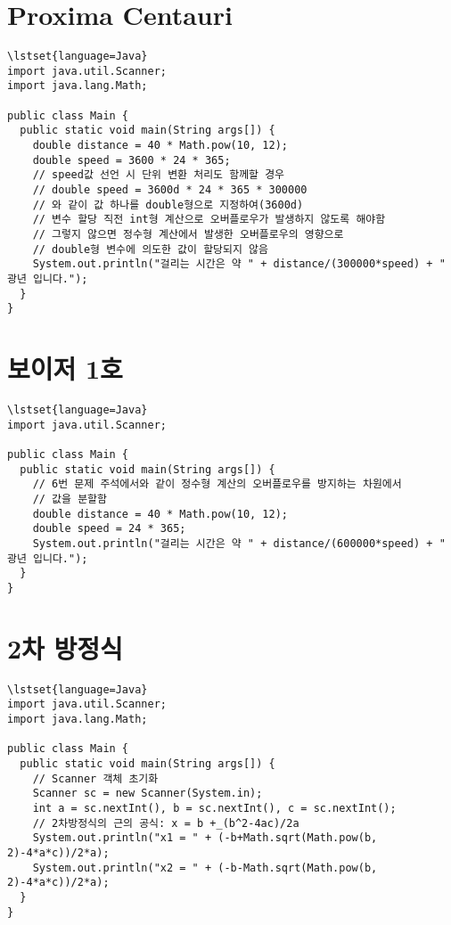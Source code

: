 \documentclass{article}
\begin{document}
\section{Proxima Centauri}
\begin{lstlisting}
\lstset{language=Java}
import java.util.Scanner;
import java.lang.Math;

public class Main {
  public static void main(String args[]) {
    double distance = 40 * Math.pow(10, 12);
    double speed = 3600 * 24 * 365;
    // speed값 선언 시 단위 변환 처리도 함께할 경우
    // double speed = 3600d * 24 * 365 * 300000
    // 와 같이 값 하나를 double형으로 지정하여(3600d)
    // 변수 할당 직전 int형 계산으로 오버플로우가 발생하지 않도록 해야함
    // 그렇지 않으면 정수형 계산에서 발생한 오버플로우의 영향으로
    // double형 변수에 의도한 값이 할당되지 않음
    System.out.println("걸리는 시간은 약 " + distance/(300000*speed) + " 광년 입니다.");
  }
}
\end{lstlisting}
\section{보이저 1호}
\begin{lstlisting}
\lstset{language=Java}
import java.util.Scanner;

public class Main {
  public static void main(String args[]) {
    // 6번 문제 주석에서와 같이 정수형 계산의 오버플로우를 방지하는 차원에서
    // 값을 분할함
    double distance = 40 * Math.pow(10, 12);
    double speed = 24 * 365;
    System.out.println("걸리는 시간은 약 " + distance/(600000*speed) + " 광년 입니다.");
  }
}
\end{lstlisting}
\section{2차 방정식}
\begin{lstlisting}
\lstset{language=Java}
import java.util.Scanner;
import java.lang.Math;

public class Main {
  public static void main(String args[]) {
    // Scanner 객체 초기화
    Scanner sc = new Scanner(System.in);
    int a = sc.nextInt(), b = sc.nextInt(), c = sc.nextInt();
    // 2차방정식의 근의 공식: x = b +_(b^2-4ac)/2a
    System.out.println("x1 = " + (-b+Math.sqrt(Math.pow(b, 2)-4*a*c))/2*a);
    System.out.println("x2 = " + (-b-Math.sqrt(Math.pow(b, 2)-4*a*c))/2*a);
  }
}
\end{lstlisting}
\end{document}
